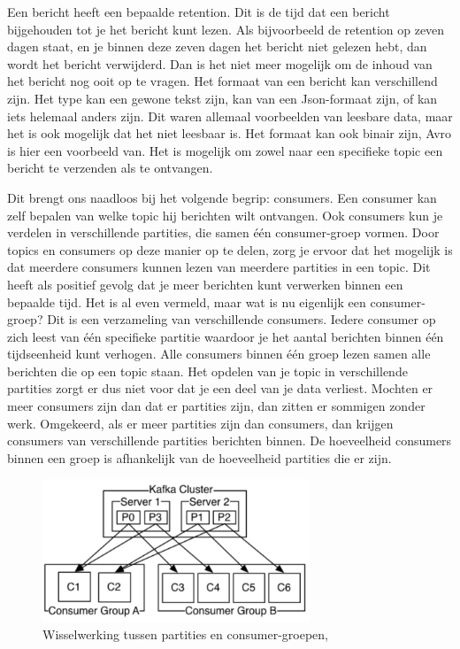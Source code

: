Een bericht heeft een bepaalde retention. Dit is de tijd dat een bericht bijgehouden tot je het bericht kunt lezen. Als bijvoorbeeld de retention op zeven dagen staat, en je binnen deze zeven dagen het bericht niet gelezen hebt, dan wordt het bericht verwijderd. Dan is het niet meer mogelijk om de inhoud van het bericht nog ooit op te vragen. Het formaat van een bericht kan verschillend zijn. Het type kan een gewone tekst zijn, kan van een Json-formaat zijn, of kan iets helemaal anders zijn. Dit waren allemaal voorbeelden van leesbare data, maar het is ook mogelijk dat het niet leesbaar is. Het formaat kan ook binair zijn, Avro is hier een voorbeeld van. Het is mogelijk om zowel naar een specifieke topic een bericht te verzenden als te ontvangen. 

Dit brengt ons naadloos bij het volgende begrip: consumers. Een consumer kan zelf bepalen van welke topic hij berichten wilt ontvangen. Ook consumers kun je verdelen in verschillende partities, die samen één consumer-groep vormen. Door topics en consumers op deze manier op te delen, zorg je ervoor dat het mogelijk is dat meerdere consumers kunnen lezen van meerdere partities in een topic. Dit heeft als positief gevolg dat je meer berichten kunt verwerken binnen een bepaalde tijd. Het is al even vermeld, maar wat is nu eigenlijk een consumer-groep? Dit is een verzameling van verschillende consumers. Iedere consumer op zich leest van één specifieke partitie waardoor je het aantal berichten binnen één tijdseenheid kunt verhogen. Alle consumers binnen één groep lezen samen alle berichten die op een topic staan. Het opdelen van je topic in verschillende partities zorgt er dus niet voor dat je een deel van je data verliest. Mochten er meer consumers zijn dan dat er partities zijn, dan zitten er sommigen zonder werk. Omgekeerd, als er meer partities zijn dan consumers, dan krijgen consumers van verschillende partities berichten binnen. De hoeveelheid consumers binnen een groep is afhankelijk van de hoeveelheid partities die er zijn.

 \begin{figure}[h!]
    \centering
    \includegraphics[width=80mm]{../kafkaConsumers.png}
    \caption{Wisselwerking tussen partities en consumer-groepen, \autocite{Sookocheff2015}}
    
\end{figure}

